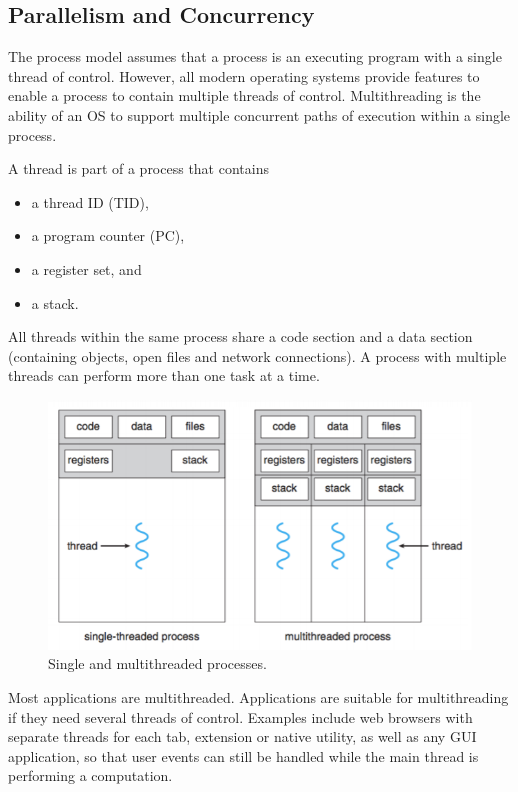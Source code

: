 \subsection{Parallelism and Concurrency}

The process model assumes that a process is an executing program with a single thread of control.
However, all modern operating systems provide features to enable a process to contain multiple threads of control.
Multithreading is the ability of an OS to support multiple concurrent paths of execution within a single process.

A thread is part of a process that contains
\begin{itemize}
  \item a thread ID (TID),
  \item a program counter (PC),
  \item a register set, and
  \item a stack.
\end{itemize}
All threads within the same process share a code section and a data section (containing objects, open files and network connections).
A process with multiple threads can perform more than one task at a time.

\begin{figure}
  \centering
  \includegraphics[width=12cm]{unit-14/figures/multithreading.png}
  \caption*{Single and multithreaded processes.}
\end{figure}

Most applications are multithreaded.
Applications are suitable for multithreading if they need several threads of control.
Examples include web browsers with separate threads for each tab, extension or native utility, as well as any GUI application, so that user events can still be handled while the main thread is performing a computation.

